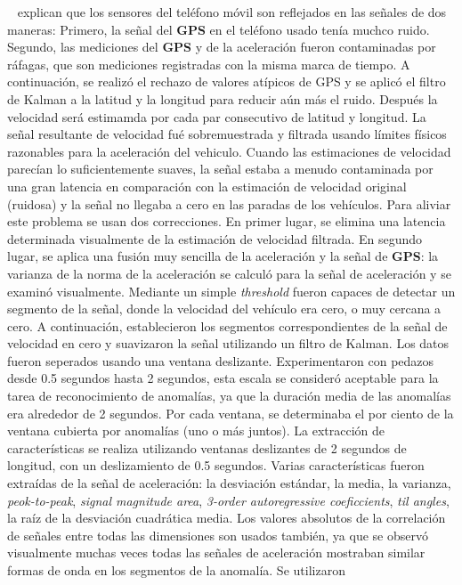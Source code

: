 		~ explican que los sensores del teléfono móvil son reflejados en las señales de dos maneras: Primero, la
		señal del \textbf{GPS} en el teléfono usado tenía muchco ruido. Segundo, las mediciones del \textbf{GPS} y de la aceleración fueron contaminadas
		por ráfagas, que son mediciones registradas con la misma marca de tiempo. A continuación, se realizó el rechazo de valores atípicos de GPS y se
		aplicó el filtro de Kalman a la latitud y la longitud para reducir aún más el ruido. Después la velocidad será estimamda por cada par consecutivo
		de latitud y longitud. La señal resultante de velocidad fué sobremuestrada y filtrada usando límites físicos razonables para la aceleración del
		vehiculo. Cuando las estimaciones de velocidad parecían lo suficientemente suaves, la señal estaba a menudo contaminada por una gran latencia en
		comparación con la estimación de velocidad original (ruidosa) y la señal no llegaba a cero en las paradas de los vehículos. Para aliviar este
		problema se usan dos correcciones. En primer lugar, se elimina una latencia determinada visualmente de la estimación de velocidad filtrada. En
		segundo lugar, se aplica una fusión muy sencilla de la aceleración y la señal de \textbf{GPS}: la varianza de la norma de la aceleración se
		calculó para la señal de aceleración y se examinó visualmente. Mediante un simple \emph{threshold} fueron capaces de detectar un segmento de
		la señal, donde la velocidad del vehículo era cero, o muy cercana a cero. A continuación, establecieron los segmentos correspondientes de la
		señal de velocidad en cero y suavizaron la señal utilizando un filtro de Kalman. Los datos fueron seperados usando una ventana deslizante.
		Experimentaron con pedazos desde 0.5 segundos hasta 2 segundos, esta escala se consideró aceptable para la tarea de reconocimiento de anomalías,
		ya que la duración media de las anomalías era alrededor de 2 segundos. Por cada ventana, se determinaba el por ciento de la ventana cubierta
		por anomalías (uno o más juntos). La extracción de características se realiza utilizando ventanas deslizantes de 2 segundos de longitud, con un
		deslizamiento de 0.5 segundos. Varias características fueron extraídas de la señal de aceleración: la desviación estándar, la media, la varianza,
		\emph{peok-to-peak}, \emph{signal magnitude area}, \emph{3-order autoregressive coeficcients}, \emph{til angles}, la raíz de la desviación
		cuadrática media. Los valores absolutos de la correlación de señales entre todas las dimensiones son usados también, ya que se observó
		visualmente muchas veces todas las señales de aceleración mostraban similar formas de onda en los segmentos de la anomalía. Se utilizaron
